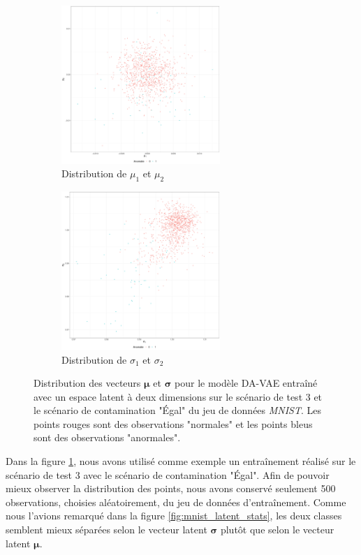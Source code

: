\begin{figure}[H]
	\centering
	\begin{subfigure}{6cm}
		\centering\includegraphics[width=6cm, height=6cm]{images/latent_stats/mnist_mu_2d}
		\caption{Distribution de $\mu_1$ et $\mu_2$}
	\end{subfigure}
	\begin{subfigure}{6cm}
		\centering\includegraphics[width=6cm, height=6cm]{images/latent_stats/mnist_sigma_2d}
		\caption{Distribution de $\sigma_1$ et $\sigma_2$}
	\end{subfigure}
	\DIFdelbeginFL %
\DIFdelendFL \DIFaddbeginFL \caption[Distribution des vecteurs $\boldsymbol{\mu}$ et $\boldsymbol{\sigma}$ pour le modèle DA-VAE entraîné avec un espace latent à deux dimensions.]{\DIFaddendFL Distribution des vecteurs $\boldsymbol{\mu}$ et $\boldsymbol{\sigma}$ pour le modèle DA-VAE entraîné avec un espace latent à deux dimensions sur le scénario de test 3 et le scénario de contamination "Égal" du jeu de données \textit{MNIST}. Les points rouges sont des observations "normales" et les points bleus sont des observations "anormales".}
	\label{fig:mnist_latent_2d}
\end{figure}

Dans la figure \ref{fig:mnist_latent_2d}, nous avons utilisé comme exemple un entraînement réalisé sur le scénario de test 3 avec le scénario de contamination "Égal". Afin de pouvoir mieux observer la distribution des points, nous avons conservé seulement 500 observations, choisies aléatoirement, du jeu de données d'entraînement. Comme nous l'avions remarqué dans la figure \ref{fig:mnist_latent_stats}, les deux classes semblent mieux séparées selon le vecteur latent $\boldsymbol{\sigma}$ plutôt que selon le vecteur latent $\boldsymbol{\mu}$.

